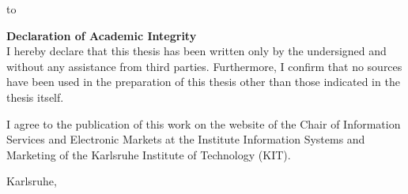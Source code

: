 \thispagestyle{empty}
\vspace*{36\baselineskip}
\hbox to \textwidth{\hrulefill}
\par
\textbf{Declaration of Academic Integrity}\\
I hereby declare that this thesis has been written only by the undersigned and
without any assistance from third parties. Furthermore, I confirm that no sources have
been used in the preparation of this thesis other than those indicated in the thesis itself.

I agree to the publication of this work on the website of the Chair of Information Services and Electronic Markets at the Institute Information Systems and Marketing of the Karlsruhe Institute of Technology (KIT).

Karlsruhe, \usebox{\thesisenddatesave}

\clearpage




